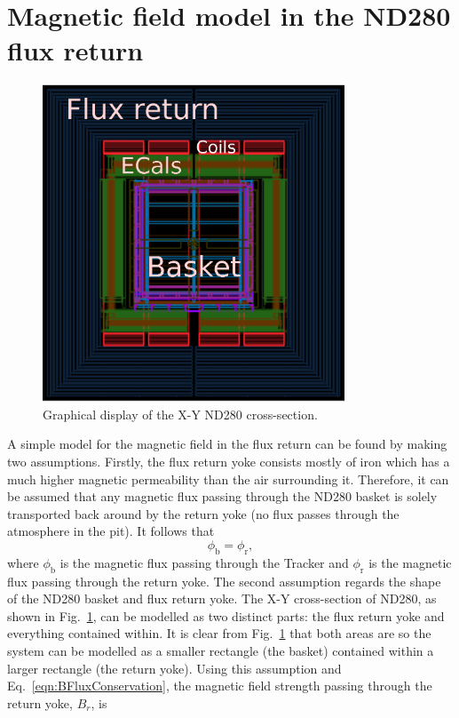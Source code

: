 \section{Magnetic field model in the ND280 flux return}
\label{sec:MagneticFieldModel}
\begin{figure}
  \centering
  \includegraphics[width=9cm]{images/magnetic_field/ND280FluxReturn}
  \caption{Graphical display of the X-Y ND280 cross-section.}
  \label{fig:ND280FluxReturn}
\end{figure}
A simple model for the magnetic field in the flux return can be found by making two assumptions.  Firstly, the flux return yoke consists mostly of iron which has a much higher magnetic permeability than the air surrounding it.  Therefore, it can be assumed that any magnetic flux passing through the ND280 basket is solely transported back around by the return yoke (no flux passes through the atmosphere in the pit).  It follows that
\begin{equation}
  \phi_{\textrm{b}} = \phi_{\textrm{r}},
  \label{eqn:BFluxConservation}
\end{equation}
where $\phi_{\textrm{b}}$ is the magnetic flux passing through the Tracker and $\phi_{\textrm{r}}$ is the magnetic flux passing through the return yoke.  The second assumption regards the shape of the ND280 basket and flux return yoke.  The X-Y cross-section of ND280, as shown in Fig.~\ref{fig:ND280FluxReturn}, can be modelled as two distinct parts: the flux return yoke and everything contained within.  It is clear from Fig.~\ref{fig:ND280FluxReturn} that both areas are  so the system can be modelled as a smaller rectangle (the basket) contained within a larger rectangle (the return yoke).  Using this assumption and Eq.~\ref{eqn:BFluxConservation}, the magnetic field strength passing through the return yoke, $B_{r}$, is
